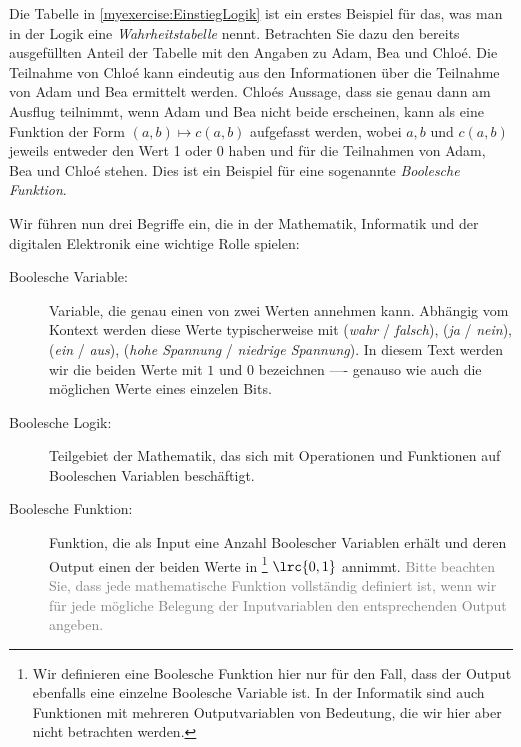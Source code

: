 Die Tabelle in \cref{myexercise:EinstiegLogik} ist ein erstes Beispiel für das, was man in der Logik eine \emph{Wahrheitstabelle} nennt. Betrachten Sie dazu den bereits ausgefüllten Anteil der Tabelle mit den Angaben zu Adam, Bea und Chloé. Die Teilnahme von Chloé kann eindeutig aus den Informationen über die Teilnahme von Adam und Bea ermittelt werden. Chloés Aussage, dass sie genau dann am Ausflug teilnimmt, wenn Adam und Bea nicht beide erscheinen, kann als eine Funktion der Form $(a,b) \mapsto c(a,b)$ aufgefasst werden, wobei $a, b$ und $c(a, b)$ jeweils entweder den Wert 1 oder 0 haben und für die Teilnahmen von Adam, Bea und Chloé stehen. Dies ist ein Beispiel für eine sogenannte \emph{Boolesche Funktion}.

\begin{mydefinition}\label{mydefinition:BoolscheLogik}
    Wir führen nun drei Begriffe ein, die in der Mathematik, Informatik und der digitalen Elektronik eine wichtige Rolle spielen:
    \begin{description}
        \item[Boolesche Variable:] Variable, die genau einen von zwei Werten annehmen kann. Abhängig vom Kontext werden diese Werte typischerweise mit (\emph{wahr} / \emph{falsch}), (\emph{ja} / \emph{nein}), (\emph{ein} / \emph{aus}), (\emph{hohe Spannung} / \emph{niedrige Spannung}).
         In diesem Text werden wir die beiden Werte mit $1$ und $0$ bezeichnen ---- genauso wie auch die möglichen Werte eines einzelen Bits.
        \item[Boolesche Logik:] Teilgebiet der Mathematik, das sich mit Operationen und Funktionen auf Booleschen Variablen beschäftigt.
        \item[Boolesche Funktion:] Funktion, die als Input eine Anzahl Boolescher Variablen erhält und deren Output einen der beiden Werte in \footnote{Wir definieren eine Boolesche Funktion hier nur für den Fall, dass der Output ebenfalls eine einzelne Boolesche Variable ist. In der Informatik sind auch Funktionen mit mehreren Outputvariablen von Bedeutung, die wir hier aber nicht betrachten werden.} $\lrc{0, 1}$ annimmt. \textcolor{Gray}{Bitte beachten Sie, dass jede mathematische Funktion vollständig definiert ist, wenn wir für jede mögliche Belegung der Inputvariablen den entsprechenden Output angeben.}
    \end{description}
\end{mydefinition}

